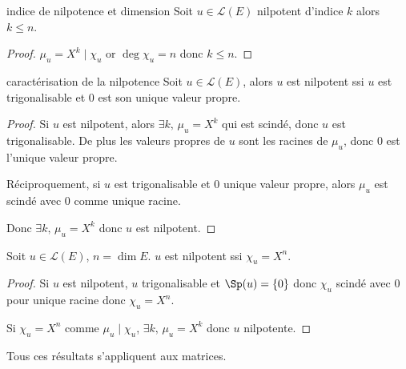 \begin{corollaire}{indice de nilpotence et dimension}{}
    Soit $u \in \mathscr L(E)$ nilpotent d'indice $k$ alors $k \leqslant n$.
\end{corollaire}

\begin{proof}
    $\mu_u = X^k \mid \chi_u$ or $\deg \chi_u = n$ donc $k \leqslant n$. 
\end{proof}

\begin{corollaire}{caractérisation de la nilpotence}{}
    Soit $u \in \mathscr L(E)$, alors $u$ est nilpotent ssi $u$ est trigonalisable et $0$ est son unique valeur
    propre. 
\end{corollaire}

\begin{proof}
    Si $u$ est nilpotent, alors $\exists k, \, \mu_u = X^k$ qui est scindé, donc $u$ est trigonalisable.
    De plus les valeurs propres de $u$ sont les racines de $\mu_u$, donc $0$ est l'unique valeur propre.

    Réciproquement, si $u$ est trigonalisable et $0$ unique valeur propre, alors $\mu_u$ est scindé avec 
    $0$ comme unique racine. 

    Donc $\exists k, \, \mu_u = X^k$ donc $u$ est nilpotent.
\end{proof}

\begin{corollaire}{}{}
    Soit $u \in \mathscr L(E)$, $n = \dim E$. $u$ est nilpotent ssi $\chi_u = X^n$.
\end{corollaire}

\begin{proof}
    Si $u$ est nilpotent, $u$ trigonalisable et $\Sp(u) = \{0\}$ donc $\chi_u$ scindé avec $0$ pour unique 
    racine donc $\chi_u = X^n$.

    Si $\chi_u = X^n$ comme $\mu_u \mid \chi_u$, $\exists k, \, \mu_u = X^k$ donc $u$ nilpotente. 
\end{proof}

\begin{remarque}
    Tous ces résultats s'appliquent aux matrices. 
\end{remarque}

